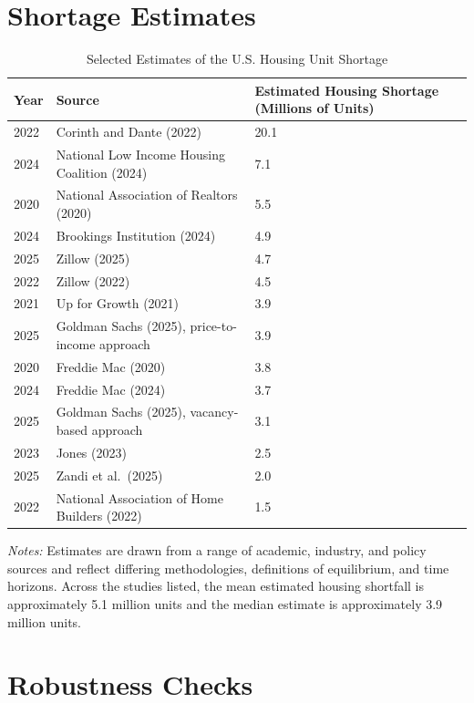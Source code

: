 \documentclass[pdflatex,sn-basic]{sn-jnl}%
\theoremstyle{thmstyleone}%
\theoremstyle{thmstyletwo}%
\theoremstyle{thmstylethree}%
\begin{document}
\begin{appendices}
\section{Shortage Estimates}\label{appendix_a}

\begin{table}[htbp]
	\centering
	\caption{Selected Estimates of the U.S. Housing Unit Shortage}
	\label{tab:housing_shortage_estimates}
	\begin{tabular}{lll}
		\hline
		Year & Source & Estimated Housing Shortage (Millions of Units) \\
		\hline
		2022 & Corinth and Dante (2022) & 20.1 \\
		2024 & National Low Income Housing Coalition (2024) & 7.1 \\
		2020 & National Association of Realtors (2020) & 5.5 \\
		2024 & Brookings Institution (2024) & 4.9 \\
		2025 & Zillow (2025) & 4.7 \\
		2022 & Zillow (2022) & 4.5 \\
		2021 & Up for Growth (2021) & 3.9 \\
		2025 & Goldman Sachs (2025), price-to-income approach & 3.9 \\
		2020 & Freddie Mac (2020) & 3.8 \\
		2024 & Freddie Mac (2024) & 3.7 \\
		2025 & Goldman Sachs (2025), vacancy-based approach & 3.1 \\
		2023 & Jones (2023) & 2.5 \\
		2025 & Zandi et al.\ (2025) & 2.0 \\
		2022 & National Association of Home Builders (2022) & 1.5 \\
		\hline
	\end{tabular}
	\begin{flushleft}
		\footnotesize
		\textit{Notes:} Estimates are drawn from a range of academic, industry, and policy sources and reflect differing methodologies, definitions of equilibrium, and time horizons. Across the studies listed, the mean estimated housing shortfall is approximately 5.1 million units and the median estimate is approximately 3.9 million units.
	\end{flushleft}
\end{table}

\section{Robustness Checks}\label{appendix_b}






\clearpage
\end{appendices}
\end{document}
